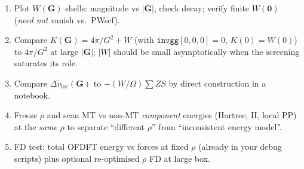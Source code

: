 \documentclass[11pt,a4paper]{article}
\begin{document}
\begin{enumerate}
  \item Plot $W(\mathbf G)$ shells: magnitude vs $|\mathbf G|$, check decay; verify finite $W(\mathbf 0)$
        (\emph{need not} vanish vs.\ PWscf).
  \item Compare $K(\mathbf G)=4\pi/G^2+W$ (with $\texttt{invgg}[0,0,0]=0$, $K(0)=W(0)$) to $4\pi/G^2$ at large $|\mathbf G|$;
        $|W|$ should be small asymptotically when the screening saturates its role.
  \item Compare $\Delta \tilde v_{\mathrm{loc}}(\mathbf G)$ to $-(W/\Omega)\sum Z S$ by
        direct construction in a notebook.
  \item Freeze $\rho$ and scan MT vs non-MT \emph{component} energies (Hartree, II,
        local PP) at the \emph{same} $\rho$ to separate ``different $\rho$'' from
        ``inconsistent energy model''.
  \item FD test: total OFDFT energy vs forces at fixed $\rho$ (already in your debug
        scripts) plus optional re-optimised $\rho$ FD at large box.
\end{enumerate}
\end{document}
